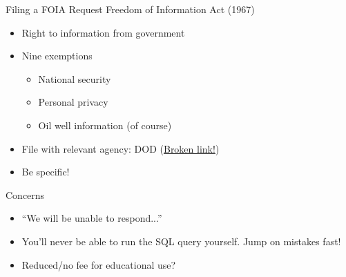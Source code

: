 \documentclass{beamer}
\begin{document}
\begin{frame}{Filing a FOIA Request}
Freedom of Information Act (1967)
\begin{itemize}
\item Right to information from government 
\item Nine exemptions \href{http://www.foiadvocates.com/exemptions.html}{}
\begin{itemize}
\item National security
\item Personal privacy
\item Oil well information (of course)
\end{itemize}
\item File with relevant agency: DOD (\href{http://www.esd.whs.mil/FOID/Submit-Request/}{Broken link!})
\item Be specific!
\end{itemize}
\end{frame}

{ %
    \begin{frame}[plain]
     \end{frame}
}


\begin{frame}[label=back]{Concerns}
\begin{itemize}
\item ``We will be unable to respond...'' \hyperlink{Moretime}{}
\item You'll never be able to run the SQL query yourself. Jump on mistakes fast!
\item Reduced/no fee for educational use? \hyperlink{More}{}
\end{itemize}
\end{frame}
\end{document}

